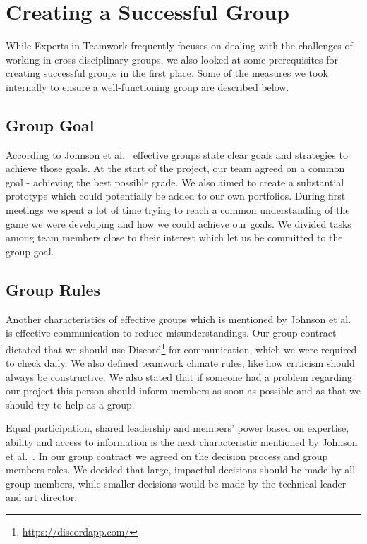 \chapter{Creating a Successful Group}
While Experts in Teamwork frequently focuses on dealing with the challenges of working in cross-disciplinary groups, we also looked at some prerequisites for creating successful groups in the first place. Some of the measures we took internally to ensure a well-functioning group are described below. 
\section{Group Goal}
According to Johnson et al.~\cite{2013johnson} effective groups state clear goals and strategies to achieve those goals. At the start of the project, our team agreed on a common goal - achieving the best possible grade. We also aimed to create a substantial prototype which could potentially be added to our own portfolios. During first meetings we spent a lot of time trying to reach a common understanding of the game we were developing and how we could achieve our goals. We divided tasks among team members close to their interest which let us be committed to the group goal. 
\section{Group Rules}
Another characteristics of effective groups which is mentioned by Johnson et al.~\cite{2013johnson} is effective communication to reduce misunderstandings. 
Our group contract dictated that we should use Discord\footnote{\url{https://discordapp.com/}} for communication, which we were required to check daily. We also defined teamwork climate rules, like how criticism should always be constructive. 
We also stated that if someone had a problem regarding our project this person should inform members as soon as possible and as that we should try to help as a group. 

Equal participation, shared leadership and members’ power based on expertise, ability and access to information is the next characteristic mentioned by Johnson et al.~\cite{2013johnson}.
In our group contract we agreed on the decision process and group members roles.
We decided that large, impactful decisions should be made by all group members, while smaller decisions would be made by the technical leader and art director.
